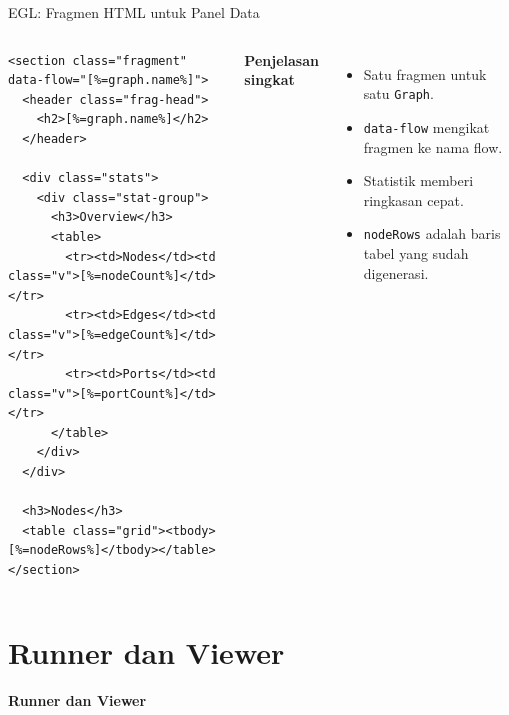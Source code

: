 \documentclass[aspectratio=169, table]{beamer}
\begin{document}
\begin{frame}[fragile]{EGL: Fragmen HTML untuk Panel Data}
\vspace{2pt}
\begin{columns}[T,onlytextwidth]
\begin{lstlisting}[language=egl, basicstyle=\ttfamily\tiny]
<section class="fragment" data-flow="[%=graph.name%]">
  <header class="frag-head">
    <h2>[%=graph.name%]</h2>
  </header>

  <div class="stats">
    <div class="stat-group">
      <h3>Overview</h3>
      <table>
        <tr><td>Nodes</td><td class="v">[%=nodeCount%]</td></tr>
        <tr><td>Edges</td><td class="v">[%=edgeCount%]</td></tr>
        <tr><td>Ports</td><td class="v">[%=portCount%]</td></tr>
      </table>
    </div>
  </div>

  <h3>Nodes</h3>
  <table class="grid"><tbody>[%=nodeRows%]</tbody></table>
</section>
\end{lstlisting}

\scriptsize
\textbf{Penjelasan singkat}
\begin{itemize}
  \item Satu fragmen untuk satu \texttt{Graph}.
  \item \texttt{data-flow} mengikat fragmen ke nama flow.
  \item Statistik memberi ringkasan cepat.
  \item \texttt{nodeRows} adalah baris tabel yang sudah digenerasi.
\end{itemize}
\end{columns}
\end{frame}

\section{Runner dan Viewer}
\begin{frame}{\hfill}
	\centering
	\Huge{\textbf{Runner dan Viewer}}
\end{frame}
\end{document}
